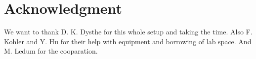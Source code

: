 \section {Acknowledgment}
We want to thank D. K. Dysthe for this whole setup and taking the time.
Also F. Kohler and Y. Hu for their help with equipment and borrowing of lab space.
And M. Ledum for the cooparation.
